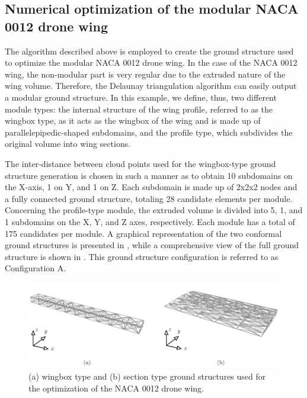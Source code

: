 \subsection{Numerical optimization of the modular NACA 0012 drone wing}
The algorithm described above is employed to create the ground structure used to optimize the modular NACA 0012 drone wing. In the case of the NACA 0012 wing, the non-modular part is very regular due to the extruded nature of the wing volume. Therefore, the Delaunay triangulation algorithm can easily output a modular ground structure. In this example, we define, thus, two different module types: the internal structure of the wing profile, referred to as the wingbox type, as it acts as the wingbox of the wing and is made up of parallelepipedic-shaped subdomains, and the profile type, which subdivides the original volume into wing sections.

The inter-distance between cloud points used for the wingbox-type ground structure generation is chosen in such a manner as to obtain 10 subdomains on the X-axis, 1 on Y, and 1 on Z. Each subdomain is made up of 2x2x2 nodes and a fully connected ground structure, totaling 28 candidate elements per module. Concerning the profile-type module, the extruded volume is divided into 5, 1, and 1 subdomains on the X, Y, and Z axes, respectively. Each module has a total of 175 candidates per module. A graphical representation of the two conformal ground structures is presented in , while a comprehensive view of the full ground structure is shown in . This ground structure configuration is referred to as Configuration A.

\begin{figure}
    \centering
    \includegraphics[width=\linewidth]{figures/07_aeronautic/00_NACA_a_gs_cell/gs_a_types.pdf}
     \caption{(a) wingbox type and (b) section type ground structures used for the optimization of the NACA 0012 drone wing.}
    \label{fig:07_gs_a_types}
\end{figure}

